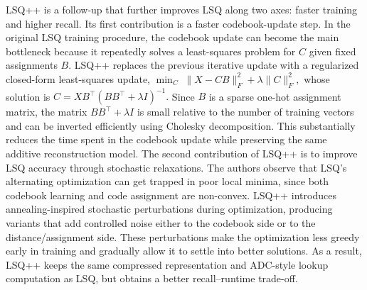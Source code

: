 \documentclass[sigconf]{acmart}
\begin{document}
LSQ++ is a follow-up that further improves LSQ along two axes: faster training and higher recall. 
Its first contribution is a faster codebook-update step. 
In the original LSQ training procedure, the codebook update can become the main bottleneck because it repeatedly solves a least-squares problem for $C$ given fixed assignments $B$. 
LSQ++ replaces the previous iterative update with a regularized closed-form least-squares update,
\(
\min_C \; \|X-CB\|_F^2 + \lambda \|C\|_F^2 ,
\)
whose solution is
\(
C
=
XB^\top
\left(BB^\top+\lambda I\right)^{-1}.
\)
Since $B$ is a sparse one-hot assignment matrix, the matrix $BB^\top+\lambda I$ is small relative to the number of training vectors and can be inverted efficiently using Cholesky decomposition. 
This substantially reduces the time spent in the codebook update while preserving the same additive reconstruction model.
The second contribution of LSQ++ is to improve LSQ accuracy through stochastic relaxations. 
The authors observe that LSQ's alternating optimization can get trapped in poor local minima, since both codebook learning and code assignment are non-convex. 
LSQ++ introduces annealing-inspired stochastic perturbations during optimization, producing variants that add controlled noise either to the codebook side or to the distance/assignment side. 
These perturbations make the optimization less greedy early in training and gradually allow it to settle into better solutions. 
As a result, LSQ++ keeps the same compressed representation and ADC-style lookup computation as LSQ, but obtains a better recall--runtime trade-off.
\end{document}
